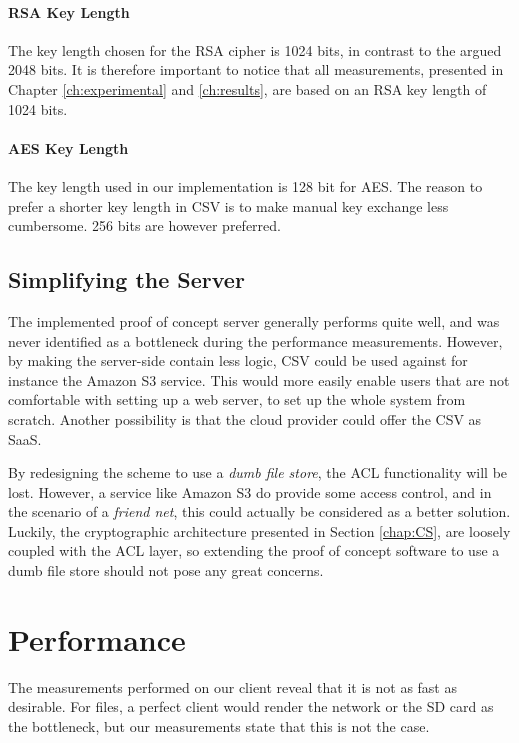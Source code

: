 \documentclass[pdftex,english,10pt,b5paper,twoside]{book}
\begin{document}
\paragraph{RSA Key Length} The key length chosen for the RSA cipher is 1024
bits, in contrast to the argued 2048 bits. It is therefore important to notice
that all measurements, presented in Chapter \ref{ch:experimental} and
\ref{ch:results}, are based on an RSA key length of 1024 bits.

\paragraph{AES Key Length} The key length used in our implementation is 128 bit
for \ac{AES}. The reason to prefer a shorter key length in \ac{CSV} is to make
manual key exchange less cumbersome. 256 bits are however preferred.

\subsection{Simplifying the Server}

The implemented proof of concept server generally performs quite well, and was
never identified as a bottleneck during the performance measurements. However,
by making the server-side contain less logic, \ac{CSV} could be used against
for instance the Amazon S3 service. This would more easily enable users that
are not comfortable with setting up a web server, to set up the whole system
from scratch. Another possibility is that the cloud provider could offer the
\ac{CSV} as \ac{SaaS}.

By redesigning the scheme to use a \emph{dumb file store}, the \ac{ACL}
functionality will be lost. However, a service like Amazon S3 do provide some
access control, and in the scenario of a \emph{friend net}, this could actually
be considered as a better solution. Luckily, the cryptographic architecture
presented in Section \ref{chap:CS}, are loosely coupled with the \ac{ACL}
layer, so extending the proof of concept software to use a dumb file store
should not pose any great concerns.

\section{Performance}

The measurements performed on our client reveal that it is not as fast as
desirable. For files, a perfect client would render the network or the SD card
as the bottleneck, but our measurements state that this is not the case.
\end{document}
